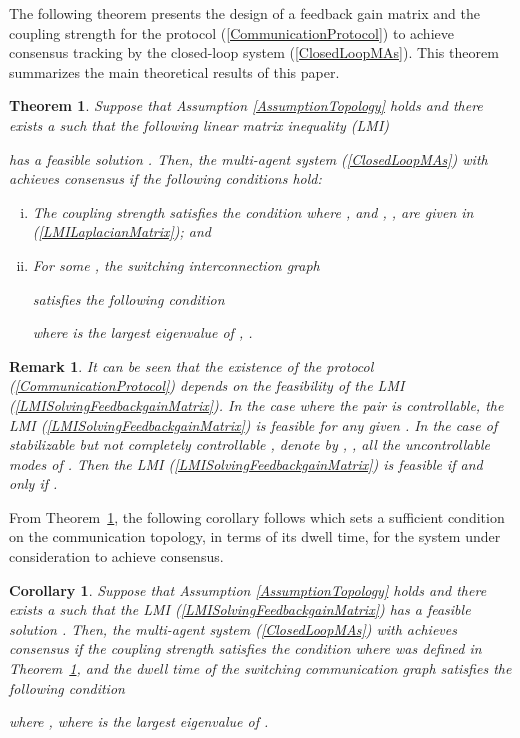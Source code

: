 \documentclass[letterpaper, 10 pt, conference]{ieeeconf}
\newtheorem{theorem}{Theorem}
\newtheorem{remark}{Remark}
\newtheorem{corollary}{Corollary}
\begin{document}
The following theorem presents
the design of a feedback gain matrix and
the coupling strength
for the protocol
(\ref{CommunicationProtocol}) to achieve
consensus tracking by the closed-loop system (\ref{ClosedLoopMAs}).
This theorem summarizes the main theoretical results of this paper.
\begin{theorem}\label{MainTheoremOne}
Suppose that Assumption \ref{AssumptionTopology} holds and there exists a
 such that the following linear matrix inequality (LMI)

has a feasible solution . Then, the multi-agent system
(\ref{ClosedLoopMAs}) with  achieves consensus if the
following conditions hold:
\begin{enumerate}[(i)]
\item
The coupling strength  satisfies the condition  where
, and ,
, are given in (\ref{LMILaplacianMatrix}); and
\item
For some , the switching interconnection graph

satisfies the following condition

where  is the largest eigenvalue
of , .
\end{enumerate}
\end{theorem}








\begin{remark}
It can be seen that the existence
of the protocol (\ref{CommunicationProtocol}) depends on the feasibility of
the LMI (\ref{LMISolvingFeedbackgainMatrix}).
In the case where the pair  is controllable, the LMI
(\ref{LMISolvingFeedbackgainMatrix}) is feasible for any given .
In the case of stabilizable  but not completely controllable ,
denote by , , all the
uncontrollable modes of . Then the LMI
(\ref{LMISolvingFeedbackgainMatrix}) is feasible if and only if
.
\end{remark}

From Theorem~\ref{MainTheoremOne}, the following corollary follows which
sets a sufficient condition on the communication topology, in terms of its
dwell time, for the system under consideration to achieve consensus.

\begin{corollary}\label{CorollaryOne}
Suppose that Assumption \ref{AssumptionTopology} holds and there exists a
 such that the LMI (\ref{LMISolvingFeedbackgainMatrix})
has a feasible solution . Then,
the multi-agent system
(\ref{ClosedLoopMAs}) with  achieves consensus if the
coupling strength  satisfies the condition  where
 was defined in Theorem~\ref{MainTheoremOne}, and the dwell time of
the switching communication graph 
satisfies the following condition

where , where  is the largest eigenvalue of .
\end{corollary}
\end{document}
